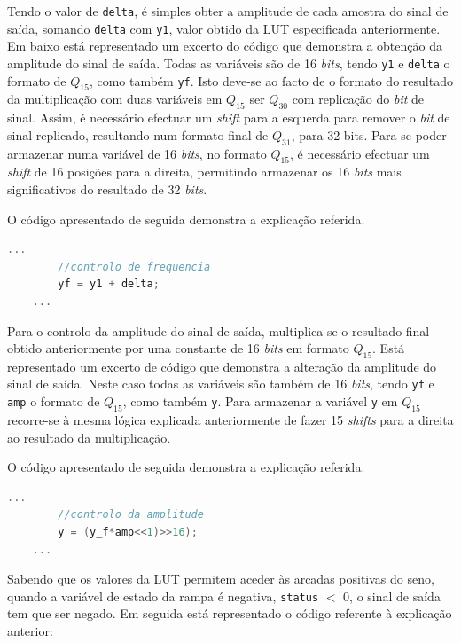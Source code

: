 \documentclass[11pt]{article}
\numberwithin{equation}{section}
\begin{document}
Tendo o valor de \texttt{delta}, é simples obter a amplitude de cada amostra do sinal de saída, somando  \texttt{delta} com \texttt{y1}, valor obtido da LUT especificada anteriormente. Em baixo está representado um excerto do código que demonstra a obtenção da amplitude do sinal de saída. Todas as variáveis são de 16 \textit{bits}, tendo \texttt{y1} e \texttt{delta} o formato de $Q_{15}$, como também \texttt{yf}. Isto deve-se ao facto de o formato do resultado da multiplicação com duas variáveis em $Q_{15}$ ser $Q_{30}$ com replicação do \textit{bit} de sinal. Assim, é necessário efectuar um \textit{shift} para a esquerda para remover o \textit{bit} de sinal replicado, resultando num formato final de $Q_{31}$, para 32 bits. Para se poder armazenar numa variável de 16 \textit{bits}, no formato $Q_{15}$, é necessário efectuar um \textit{shift} de 16 posições para a direita, permitindo armazenar os 16 \textit{bits} mais significativos do resultado de 32 \textit{bits}.


O código apresentado de seguida demonstra a explicação referida.

\begin{lstlisting}[language=C]
	...
		//controlo de frequencia
		yf = y1 + delta;
	...
\end{lstlisting}


Para o controlo da amplitude do sinal de saída, multiplica-se o resultado final obtido anteriormente por uma constante de 16 \textit{bits} em formato $Q_{15}$. Está representado um excerto de código que demonstra a alteração da amplitude do sinal de saída. Neste caso todas as variáveis são também de 16 \textit{bits}, tendo \texttt{yf} e \texttt{amp} o formato de $Q_{15}$, como também \texttt{y}. Para armazenar a variável \texttt{y} em $Q_{15}$ recorre-se à mesma lógica explicada anteriormente de fazer 15 \textit{shifts} para a direita ao resultado da multiplicação.

O código apresentado de seguida demonstra a explicação referida.

\begin{lstlisting}[language=C]
	...
		//controlo da amplitude
		y = (y_f*amp<<1)>>16);
	...
\end{lstlisting}

Sabendo que os valores da LUT permitem aceder às arcadas positivas do seno, quando a variável de estado da rampa é negativa, \texttt{status} $<$ 0, o sinal de saída tem que ser negado. Em seguida está representado o código referente à explicação anterior:
\end{document}
